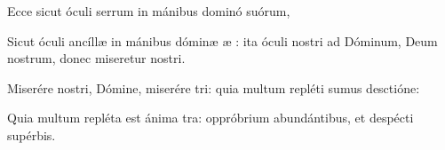 \item {}

\item Ecce sicut óculi serrum\psstar{} in mánibus dominó suórum,

\item Sicut óculi ancíllæ in mánibus dóminæ æ :\psstar{} ita óculi nostri ad Dóminum, Deum nostrum, donec miseretur nostri.

\item Miserére nostri, Dómine, miserére tri:\psstar{} quia multum repléti sumus desctióne:

\item Quia multum repléta est ánima tra:\psstar{} oppróbrium abundántibus, et despécti supérbis.
